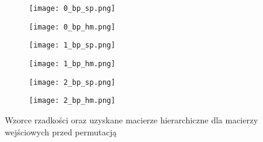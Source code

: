 \documentclass{../myclass}
\begin{document}
\begin{figure}
    \centering
    \begin{subfigure}[b]{0.45\textwidth}
        \centering
        \texttt{[image: 0\_bp\_sp.png]}
    \end{subfigure}
    \hfill
    \begin{subfigure}[b]{0.45\textwidth}
        \centering
        \texttt{[image: 0\_bp\_hm.png]}
    \end{subfigure}
    \vfill
    \centering
    \begin{subfigure}[b]{0.45\textwidth}
        \centering
        \texttt{[image: 1\_bp\_sp.png]}
    \end{subfigure}
    \hfill
    \begin{subfigure}[b]{0.45\textwidth}
        \centering
        \texttt{[image: 1\_bp\_hm.png]}
    \end{subfigure}
    \vfill
    \centering
    \begin{subfigure}[b]{0.45\textwidth}
        \centering
        \texttt{[image: 2\_bp\_sp.png]}
    \end{subfigure}
    \hfill
    \begin{subfigure}[b]{0.45\textwidth}
        \centering
        \texttt{[image: 2\_bp\_hm.png]}
    \end{subfigure}
    \caption{Wzorce rzadkości oraz uzyskane macierze hierarchiczne dla macierzy wejściowych przed permutacją}
    \label{Fig:1}
\end{figure}
\end{document}
